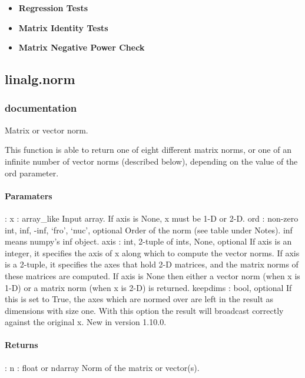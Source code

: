 \documentclass[a4paper,11pt]{article}
\begin{document}
\begin{itemize}
	\item \textbf{Regression Tests}
	\item \textbf{Matrix Identity Tests}
	\item \textbf{Matrix Negative Power Check}
\end{itemize}



\subsection{linalg.norm}
\subsubsection{documentation}
Matrix or vector norm.

This function is able to return one of eight different matrix norms, or one of an infinite number of vector norms (described below), depending on the value of the ord parameter.\\

\paragraph{Paramaters}: 
x : array\_like
Input array. If axis is None, x must be 1-D or 2-D.
ord : {non-zero int, inf, -inf, ‘fro’, ‘nuc’}, optional
Order of the norm (see table under Notes). inf means numpy’s inf object.
axis : {int, 2-tuple of ints, None}, optional
If axis is an integer, it specifies the axis of x along which to compute the vector norms. If axis is a 2-tuple, it specifies the axes that hold 2-D matrices, and the matrix norms of these matrices are computed. If axis is None then either a vector norm (when x is 1-D) or a matrix norm (when x is 2-D) is returned.
keepdims : bool, optional
If this is set to True, the axes which are normed over are left in the result as dimensions with size one. With this option the result will broadcast correctly against the original x.
New in version 1.10.0.\\

\paragraph{Returns}:    
n : float or ndarray
Norm of the matrix or vector(s).\\
\end{document}
